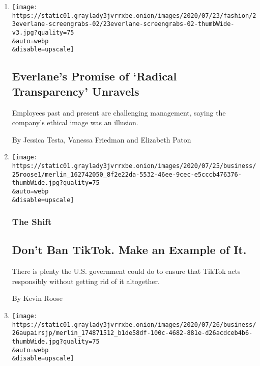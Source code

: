 \begin{enumerate}
\def\labelenumi{\arabic{enumi}.}
\item
  \href{/2020/07/26/fashion/everlane-employees-ethical-clothing.html}{}

  \texttt{[image: https://static01.graylady3jvrrxbe.onion/images/2020/07/23/fashion/23everlane-screengrabs-02/23everlane-screengrabs-02-thumbWide-v3.jpg?quality=75\\\&auto=webp\\\&disable=upscale]}

  \hypertarget{everlanes-promise-of-radical-transparency-unravels}{%
  \subsection{Everlane's Promise of `Radical Transparency'
  Unravels}\label{everlanes-promise-of-radical-transparency-unravels}}

  Employees past and present are challenging management, saying the
  company's ethical image was an illusion.

  By Jessica Testa, Vanessa Friedman and Elizabeth Paton
\item
  \href{/2020/07/26/technology/tiktok-china-ban-model.html}{}

  \texttt{[image: https://static01.graylady3jvrrxbe.onion/images/2020/07/25/business/25roose1/merlin\_162742050\_8f2e22da-5532-46ee-9cec-e5cccb476376-thumbWide.jpg?quality=75\\\&auto=webp\\\&disable=upscale]}

  \hypertarget{the-shift}{%
  \subsubsection{The Shift}\label{the-shift}}

  \hypertarget{dont-ban-tiktok-make-an-example-of-it}{%
  \subsection{Don't Ban TikTok. Make an Example of
  It.}\label{dont-ban-tiktok-make-an-example-of-it}}

  There is plenty the U.S. government could do to ensure that TikTok
  acts responsibly without getting rid of it altogether.

  By Kevin Roose
\item
  \href{/2020/07/25/business/the-great-au-pair-rush.html}{}

  \texttt{[image: https://static01.graylady3jvrrxbe.onion/images/2020/07/26/business/26aupairsjp/merlin\_174871512\_b1de58df-100c-4682-881e-d26acdceb4b6-thumbWide.jpg?quality=75\\\&auto=webp\\\&disable=upscale]}


\end{enumerate}
